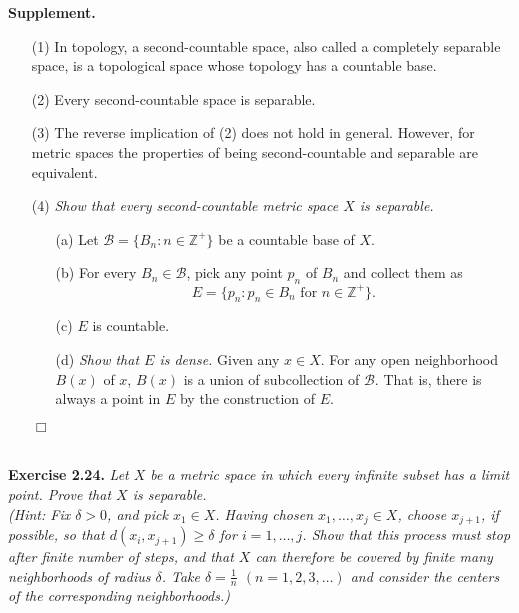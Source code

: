 \documentclass{article}
\begin{document}
\textbf{Supplement.}
\begin{enumerate}
\item[(1)]
In topology, a second-countable space, also called a completely separable space,
is a topological space whose topology has a countable base.
\item[(2)]
Every second-countable space is separable.
\item[(3)]
The reverse implication of (2) does not hold in general.
However, for metric spaces
the properties of being second-countable and separable are equivalent.
\item[(4)]
\emph{Show that every second-countable metric space $X$ is separable.}
  \begin{enumerate}
  \item[(a)]
  Let $\mathscr{B} = \{ B_n : n \in \mathbb{Z}^+ \}$ be a countable base of $X$.
  \item[(b)]
  For every $B_n \in \mathscr{B}$, pick any point $p_n$ of $B_n$
  and collect them as $$E = \{ p_n : p_n \in B_n \text{ for } n \in \mathbb{Z}^+ \}.$$
  \item[(c)]
  $E$ is countable.
  \item[(d)]
  \emph{Show that $E$ is dense.}
  Given any $x \in X$.
  For any open neighborhood $B(x)$ of $x$,
  $B(x)$ is a union of subcollection of $\mathscr{B}$.
  That is,
  there is always a point in $E$ by the construction of $E$.
  \end{enumerate}
  $\Box$ \\\\
\end{enumerate}






\textbf{Exercise 2.24.}
\emph{Let $X$ be a metric space in which every infinite subset has a limit point.
Prove that $X$ is separable.} \\

\emph{(Hint: Fix $\delta>0$, and pick $x_1 \in X$.
Having chosen $x_1, \ldots, x_j \in X$, choose $x_{j+1}$, if possible,
so that $d(x_i,x_{j+1}) \geq \delta$ for $i=1,\ldots,j$.
Show that this process must stop after finite number of steps,
and that $X$ can therefore be covered by finite many neighborhoods of radius $\delta$.
Take $\delta = \frac{1}{n}$ $(n=1,2,3,\ldots)$
and consider the centers of the corresponding neighborhoods.) } \\
\end{document}
